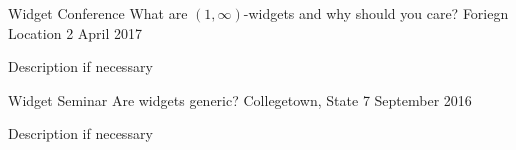 

\begin{cventries}
  \cvtalk
    {Widget Conference} %
    {What are $(1,\infty)$-widgets and why should you care?} %
    {Foriegn Location} %
    {2 April 2017} %
    {
      \begin{cvitems} %
        \item {Description if necessary}
      \end{cvitems}
    }
  \cvtalk
    {Widget Seminar} %
    {Are widgets generic?} %
    {Collegetown, State} %
    {7 September 2016} %
    {
      \begin{cvitems} %
        \item {Description if necessary}
      \end{cvitems}
    }
\end{cventries}
